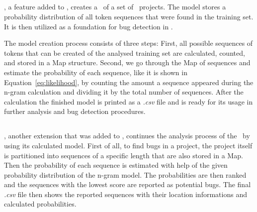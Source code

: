 \subsection{\ngramtrainer{}}\label{subsec:ngramtrainer}
\ngramtrainer, a feature added to \litterbox, creates a \ngram\ of a set of \scratch\ projects. The model stores a probability distribution of all token sequences that were found in the training set. It is then utilized as a foundation for bug detection in \scratch.

The model creation process consists of three steps: First, all possible sequences of tokens that can be created of the analysed training set are calculated, counted, and stored in a Map structure. Second, we go through the Map of sequences and estimate the probability of each sequence, like it is shown in Equation~\ref{eq:likelihood}, by counting the amount a sequence appeared during the n-gram calculation and dividing it by the total number of sequences. After the calculation the finished model is printed as a \textit{.csv} file and is ready for its usage in further analysis and bug detection procedures.

\subsection{\ngrambugfinder{}}\label{subsec:ngrambugfinder}
\ngrambugfinder, another extension that was added to \litterbox, continues the analysis process of the \ngramtrainer\ by using its calculated model. First of all, to find bugs in a project, the project itself is partitioned into sequences of a specific length that are also stored in a Map. Then the probability of each sequence is estimated with help of the given probability distribution of the n-gram model. The probabilities are then ranked and the sequences with the lowest score are reported as potential bugs. The final \textit{.csv} file then shows the reported sequences with their location informations and calculated probabilities.